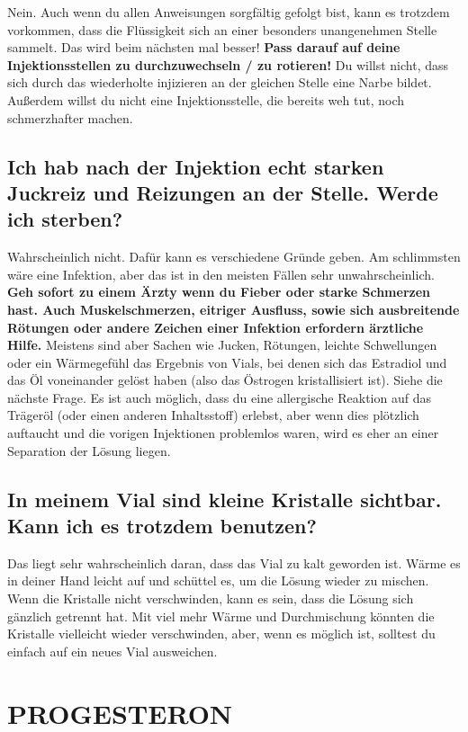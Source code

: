 \documentclass{article}
\begin{document}
Nein. Auch wenn du allen Anweisungen sorgfältig gefolgt bist, kann es trotzdem vorkommen, dass die Flüssigkeit sich an einer besonders unangenehmen Stelle sammelt. Das wird beim nächsten mal besser! \textbf{Pass darauf auf deine Injektionsstellen zu durchzuwechseln / zu rotieren!} Du willst nicht, dass sich durch das wiederholte injizieren an der gleichen Stelle eine Narbe bildet. Außerdem willst du nicht eine Injektionsstelle, die bereits weh tut, noch schmerzhafter machen.

\subsection{Ich hab nach der Injektion echt starken Juckreiz und Reizungen an der Stelle. Werde ich sterben?}

Wahrscheinlich nicht. Dafür kann es verschiedene Gründe geben. Am schlimmsten wäre eine Infektion, aber das ist in den meisten Fällen sehr unwahrscheinlich. \textbf{Geh sofort zu einem Ärzty wenn du Fieber oder starke Schmerzen hast. Auch Muskelschmerzen, eitriger Ausfluss, sowie sich ausbreitende Rötungen oder andere Zeichen einer Infektion erfordern ärztliche Hilfe. } Meistens sind aber Sachen wie Jucken, Rötungen, leichte Schwellungen oder ein Wärmegefühl das Ergebnis von Vials, bei denen sich das Estradiol und das Öl voneinander gelöst haben (also das Östrogen kristallisiert ist). Siehe die nächste Frage. Es ist auch möglich, dass du eine allergische Reaktion auf das Trägeröl (oder einen anderen Inhaltsstoff) erlebst, aber wenn dies plötzlich auftaucht und die vorigen Injektionen problemlos waren, wird es eher an einer Separation der Lösung liegen.

\subsection{In meinem Vial sind kleine Kristalle sichtbar. Kann ich es trotzdem benutzen?}

Das liegt sehr wahrscheinlich daran, dass das Vial zu kalt geworden ist. Wärme es in deiner Hand leicht auf und schüttel es, um die Lösung wieder zu mischen. Wenn die Kristalle nicht verschwinden, kann es sein, dass die Lösung sich gänzlich getrennt hat. Mit viel mehr Wärme und Durchmischung könnten die Kristalle vielleicht wieder verschwinden, aber, wenn es möglich ist, solltest du einfach auf ein neues Vial ausweichen.



\section{PROGESTERON}
\end{document}

